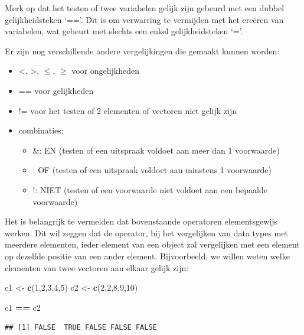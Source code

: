 \documentclass[
]{book}
\newenvironment{Shaded}{\begin{snugshade}}{\end{snugshade}}
\newcommand{\DecValTok}[1]{\textcolor[rgb]{0.00,0.00,0.81}{#1}}
\newcommand{\FunctionTok}[1]{\textcolor[rgb]{0.13,0.29,0.53}{\textbf{#1}}}
\newcommand{\NormalTok}[1]{#1}
\newcommand{\OtherTok}[1]{\textcolor[rgb]{0.56,0.35,0.01}{#1}}
\newcommand{\SpecialCharTok}[1]{\textcolor[rgb]{0.81,0.36,0.00}{\textbf{#1}}}
\begin{document}
Merk op dat het testen of twee variabelen gelijk zijn gebeurd met een dubbel gelijkheidsteken `=='. Dit is om verwarring te vermijden met het creëren van variabelen, wat gebeurt met slechts een enkel gelijkheidsteken `='.

Er zijn nog verschillende andere vergelijkingen die gemaakt kunnen worden:

\begin{itemize}
\item
  \textless, \textgreater, \(\leq\), \(\geq\) voor ongelijkheden
\item
  == voor gelijkheden
\item
  != voor het testen of 2 elementen of vectoren niet gelijk zijn
\item
  combinaties:

  \begin{itemize}
  \item
    \&: EN (testen of een uitspraak voldoet aan meer dan 1 voorwaarde)
  \item
    \textbar: OF (testen of een uitspraak voldoet aan minstens 1 voorwaarde)
  \item
    !: NIET (testen of een voorwaarde niet voldoet aan een bepaalde voorwaarde)
  \end{itemize}
\end{itemize}

Het is belangrijk te vermelden dat bovenstaande operatoren elementsgewijs werken. Dit wil zeggen dat de operator, bij het vergelijken van data types met meerdere elementen, ieder element van een object zal vergelijken met een element op dezelfde positie van een ander element. Bijvoorbeeld, we willen weten welke elementen van twee vectoren aan elkaar gelijk zijn:

\begin{Shaded}
\begin{Highlighting}[]
\NormalTok{c1 }\OtherTok{\textless{}{-}} \FunctionTok{c}\NormalTok{(}\DecValTok{1}\NormalTok{,}\DecValTok{2}\NormalTok{,}\DecValTok{3}\NormalTok{,}\DecValTok{4}\NormalTok{,}\DecValTok{5}\NormalTok{)}
\NormalTok{c2 }\OtherTok{\textless{}{-}} \FunctionTok{c}\NormalTok{(}\DecValTok{2}\NormalTok{,}\DecValTok{2}\NormalTok{,}\DecValTok{8}\NormalTok{,}\DecValTok{9}\NormalTok{,}\DecValTok{10}\NormalTok{)}

\NormalTok{c1 }\SpecialCharTok{==}\NormalTok{ c2}
\end{Highlighting}
\end{Shaded}

\begin{verbatim}
## [1] FALSE  TRUE FALSE FALSE FALSE
\end{verbatim}
\end{document}

